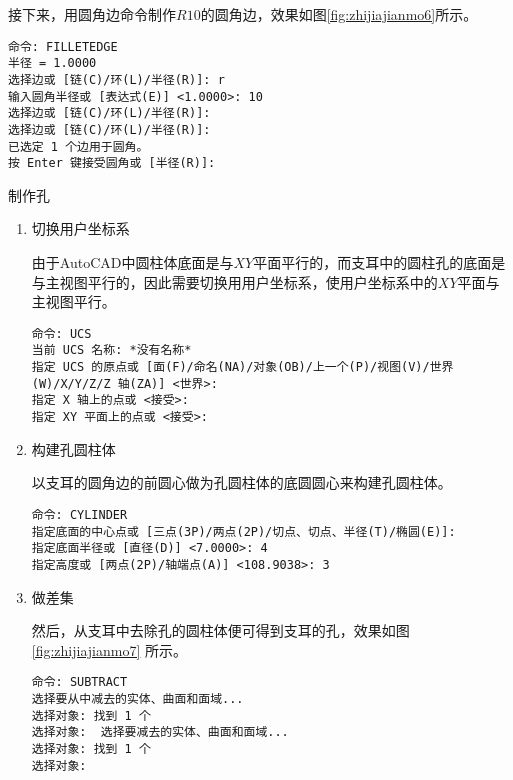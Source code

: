 \begin{procedure}
接下来，用圆角边命令制作$R10$的圆角边，效果如图\ref{fig:zhijiajianmo6}所示。

\begin{lstlisting}
命令: FILLETEDGE
半径 = 1.0000
选择边或 [链(C)/环(L)/半径(R)]: r
输入圆角半径或 [表达式(E)] <1.0000>: 10
选择边或 [链(C)/环(L)/半径(R)]:
选择边或 [链(C)/环(L)/半径(R)]:
已选定 1 个边用于圆角。
按 Enter 键接受圆角或 [半径(R)]:
\end{lstlisting}

\item 制作孔

\begin{enumerate}
\item 切换用户坐标系

由于AutoCAD中圆柱体底面是与$XY$平面平行的，而支耳中的圆柱孔的底面是与主视图平行的，因此需要切换用用户坐标系，使用户坐标系中的$XY$平面与主视图平行。

\begin{lstlisting}
命令: UCS
当前 UCS 名称: *没有名称*
指定 UCS 的原点或 [面(F)/命名(NA)/对象(OB)/上一个(P)/视图(V)/世界(W)/X/Y/Z/Z 轴(ZA)] <世界>:
指定 X 轴上的点或 <接受>:
指定 XY 平面上的点或 <接受>:
\end{lstlisting}


\item 构建孔圆柱体

以支耳的圆角边的前圆心做为孔圆柱体的底圆圆心来构建孔圆柱体。
\begin{lstlisting}
命令: CYLINDER
指定底面的中心点或 [三点(3P)/两点(2P)/切点、切点、半径(T)/椭圆(E)]:
指定底面半径或 [直径(D)] <7.0000>: 4
指定高度或 [两点(2P)/轴端点(A)] <108.9038>: 3
\end{lstlisting}

\item 做差集

然后，从支耳中去除孔的圆柱体便可得到支耳的孔，效果如图\ref{fig:zhijiajianmo7} 所示。
\begin{lstlisting}
命令: SUBTRACT 
选择要从中减去的实体、曲面和面域...
选择对象: 找到 1 个
选择对象:  选择要减去的实体、曲面和面域...
选择对象: 找到 1 个
选择对象:
\end{lstlisting}

\end{enumerate}
\end{procedure}

